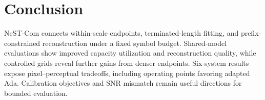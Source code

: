 \section{Conclusion}
NeST-Com connects within-scale endpoints, terminated-length fitting, and prefix-constrained reconstruction under a fixed symbol budget. Shared-model evaluations show improved capacity utilization and reconstruction quality, while controlled grids reveal further gains from denser endpoints. Six-system results expose pixel--perceptual tradeoffs, including operating points favoring adapted Ada. Calibration objectives and SNR mismatch remain useful directions for bounded evaluation.
